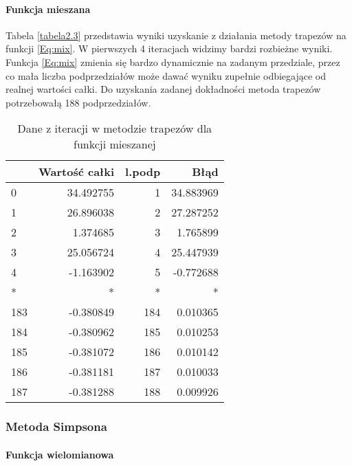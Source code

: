 \documentclass[12pt,twoside]{article}
\begin{document}
\paragraph{Funkcja mieszana}

Tabela \eqref{tabela2.3} przedstawia wyniki uzyskanie z działania metody trapezów na funkcji \eqref{Eq:mix}. W pierwszych 4 iteracjach widzimy bardzi rozbieżne wyniki. Funkcja \eqref{Eq:mix} zmienia się bardzo dynamicznie na zadanym przedziale, przez co mała liczba podprzedziałów może dawać wyniku zupełnie odbiegające od realnej wartości całki. Do uzyskania zadanej dokładności metoda trapezów potrzebowałą 188 podprzedziałów.

\begin{table}[H]
\centering
\caption{Dane z iteracji w metodzie trapezów dla funkcji mieszanej}
\label{tabela2.3}
\begin{tabular}{lrrr}
\toprule
{} &  Wartość całki &  l.podp &       Błąd \\
\midrule
0   &      34.492755 &       1 &  34.883969 \\
1   &      26.896038 &       2 &  27.287252 \\
2   &       1.374685 &       3 &   1.765899 \\
3   &      25.056724 &       4 &  25.447939 \\
4   &      -1.163902 &       5 &  -0.772688 \\
*   &       * &       * &   * \\
183 &      -0.380849 &     184 &   0.010365 \\
184 &      -0.380962 &     185 &   0.010253 \\
185 &      -0.381072 &     186 &   0.010142 \\
186 &      -0.381181 &     187 &   0.010033 \\
187 &      -0.381288 &     188 &   0.009926 \\
\bottomrule
\end{tabular}

\end{table}

\subsubsection{Metoda Simpsona}

\paragraph{Funkcja wielomianowa}
\end{document}
